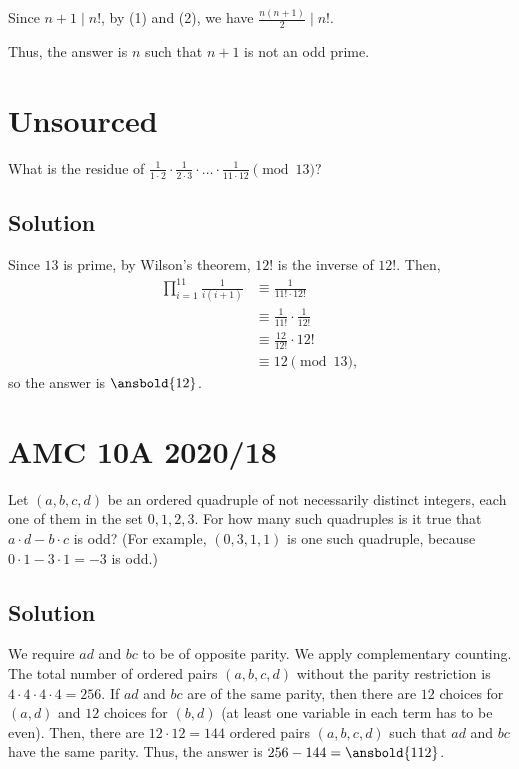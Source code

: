 \documentclass[mast]{lucky}
\begin{document}
Since $n + 1 \mid n!$, by (1) and (2), we have $\frac{n(n + 1)}{2} \mid n!$. 

\bigskip

Thus, the answer is $n$ such that $n + 1$ is not an odd prime.

\pagebreak\section{Unsourced}

What is the residue of $\frac{1}{1\cdot 2}\cdot \frac{1}{2\cdot 3}\cdot \dots \cdot \frac{1}{11\cdot 12}\pmod {13}?$

\subsection{Solution}

Since $13$ is prime, by Wilson's theorem, $12!$ is the inverse of $12!$. Then, 
\begin{align*}
\prod_{i = 1}^{11} \frac{1}{i(i + 1)} &\equiv \frac{1}{11! \cdot 12!} \\
&\equiv \frac{1}{11!} \cdot \frac{1}{12!} \\
&\equiv \frac{12}{12!} \cdot 12! \\
&\equiv 12 \pmod{13},
\end{align*}
so the answer is $\ansbold{12}$.

\pagebreak\section{AMC 10A 2020/18}

Let $(a,b,c,d)$ be an ordered quadruple of not necessarily distinct integers, each one of them in the set ${0,1,2,3}.$ For how many such quadruples is it true that $a\cdot d-b\cdot c$ is odd? (For example, $(0,3,1,1)$ is one such quadruple, because $0\cdot 1-3\cdot 1 = -3$ is odd.)

\subsection{Solution}

We require $ad$ and $bc$ to be of opposite parity. We apply complementary counting. The total number of ordered pairs $(a, b, c, d)$ without the parity restriction is $4 \cdot 4 \cdot 4 \cdot 4 = 256$. If $ad$ and $bc$ are of the same parity, then there are $12$ choices for $(a, d)$ and $12$ choices for $(b, d)$ (at least one variable in each term has to be even). Then, there are $12 \cdot 12 = 144$ ordered pairs $(a, b, c, d)$ such that $ad$ and $bc$ have the same parity. Thus, the answer is $256 - 144 = \ansbold{112}$.
\end{document}

